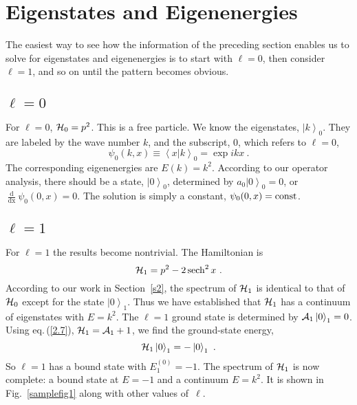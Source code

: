 \documentclass[12pt,twoside]{article}
\newcommand{\sech}{\mathop{\rm sech}\nolimits}
\newcommand{\ket}[1]{\left|#1\right\rangle}
\newcommand{\braket}[2]{\left\langle#1 |  #2\right\rangle}
\newcommand{\rd}[1]{\mathop{\mathrm{d}#1}}
\begin{document}
\section{Eigenstates and Eigenenergies}

\noindent
The easiest way to see how the information of the preceding section enables us to solve for eigenstates and eigenenergies is to start with $\ell=0$, then consider $\ell=1$, and so on until the pattern becomes obvious.

\subsection{\protect\boldmath$\ell=0$}

\noindent
For $\ell=0$, ${\cal H}_0=p^2$.  This is a free particle.  We know the eigenstates, $\ket k_0$.  They are labeled by the wave
number $k$, and the subscript, 0, which refers to $\ell=0$,
%
\begin{equation}
  \psi_0(k,x) \equiv \braket xk_0 = \exp ikx\ .   \label{3.1}
\end{equation}
%
The corresponding eigenenergies are $E(k)=k^2$.  According to our operator analysis, there should be a state, $\ket0_0$, determined by $a_0\ket 0_0=0$, or $\frac{\rd{}}{\rd x}\psi_0(0,x)=0$.  The solution is simply a constant, $\psi_0(0,x)={\rm const}$.

\subsection {\protect\boldmath$\ell=1$}

\noindent
For $\ell=1$ the results become nontrivial.  The Hamiltonian is
%
\begin{equation}
  {\cal H}_1 = p^2-2\sech^2x\ .   \label{3.2}
\end{equation}
%
According to our work in Section~\ref{s2}, the spectrum of ${\cal H}_1$ is identical to that of ${\cal H}_0$ except for the state $\ket0_1$.  Thus we have established that ${\cal H}_1$ has a continuum of eigenstates with $E=k^2$.  
The $\ell=1$ ground state is determined by ${\cal A}_1\ket0_1=0$.  Using eq.\,(\ref{2.7}), ${\cal H}_1={\cal A}_1+1$, we find the ground-state energy,
%
\begin{equation}
  {\cal H}_1\ket0_1=-\ket0_1\ .   \label{3.5}
\end{equation}
%
So $\ell=1$ has a bound state with $E^{(0)}_1=-1$.  The spectrum of ${\cal H }_1$ is now complete:  a bound state at $E=-1$ and a continuum $E=k^2$.  It is shown in Fig.~\ref{samplefig1} along with other 
values of~$\ell$.
\end{document}
